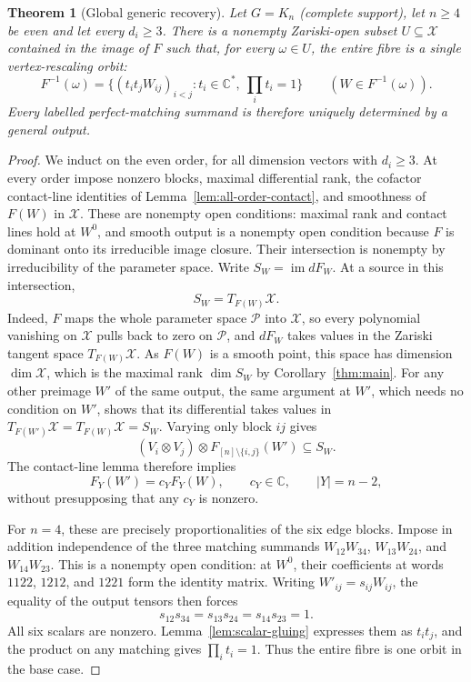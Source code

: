 \documentclass[11pt]{article}
\newtheorem{theorem}{Theorem}[section]
\theoremstyle{remark}\newtheorem{remark}[theorem]{Remark}
\newcommand{\C}{\mathbb C}
\newcommand{\cP}{\mathcal P}
\newcommand{\cX}{\mathcal X}
\begin{document}
\begin{theorem}[Global generic recovery]\label{thm:global-all-order}
Let $G=K_n$ (complete support), let $n\geq4$ be even and let every
$d_i\geq3$. There is a nonempty
Zariski-open subset $U\subseteq\cX$ contained in the image of $F$
such that, for every $\omega\in U$, the entire fibre is a single
vertex-rescaling orbit:
\[
 F^{-1}(\omega)=\{(t_it_jW_{ij})_{i<j}:t_i\in\C^*,\ \prod_i t_i=1\}
 \qquad(W\in F^{-1}(\omega)).
\]
Every labelled perfect-matching summand is therefore uniquely
determined by a general output.
\end{theorem}
\begin{proof}
We induct on the even order, for all dimension vectors with $d_i\geq3$.
At every order impose nonzero blocks, maximal differential rank,
the cofactor contact-line identities of
Lemma~\ref{lem:all-order-contact}, and smoothness of $F(W)$ in
$\cX$. These are nonempty open conditions: maximal rank and contact
lines hold at $W^0$, and smooth output is a nonempty open condition
because $F$ is dominant onto its irreducible image closure.
Their intersection is nonempty by irreducibility of the parameter
space. Write $S_W=\operatorname{im}dF_W$. At a source in this
intersection,
\[
 S_W=T_{F(W)}\cX.
\]
Indeed, $F$ maps the whole parameter space $\cP$ into $\cX$, so every
polynomial vanishing on $\cX$ pulls back to zero on $\cP$, and $dF_W$
takes values in the Zariski tangent space $T_{F(W)}\cX$. As $F(W)$ is
a smooth point, this space has dimension $\dim\cX$, which is the
maximal rank $\dim S_W$ by Corollary~\ref{thm:main}.
For any other preimage $W'$ of the same output, the same argument at
$W'$, which needs no condition on $W'$, shows that its differential
takes values in $T_{F(W')}\cX=T_{F(W)}\cX=S_W$. Varying only block
$ij$ gives
\[
 (V_i\otimes V_j)\otimes F_{[n]\setminus\{i,j\}}(W')
 \subseteq S_W.
\]
The contact-line lemma therefore implies
\begin{equation}\label{eq:all-order-proportional-cofactors}
 F_Y(W')=c_YF_Y(W),\qquad c_Y\in\C,
 \qquad |Y|=n-2,
\end{equation}
without presupposing that any $c_Y$ is nonzero.

For $n=4$, these are precisely proportionalities of the six edge
blocks. Impose in addition independence of the three matching
summands $W_{12}W_{34}$, $W_{13}W_{24}$, and $W_{14}W_{23}$.
This is a nonempty open condition: at $W^0$, their coefficients at
words $1122$, $1212$, and $1221$ form the identity matrix.
Writing $W'_{ij}=s_{ij}W_{ij}$, the equality of the output tensors
then forces
\[
 s_{12}s_{34}=s_{13}s_{24}=s_{14}s_{23}=1.
\]
All six scalars are nonzero. Lemma~\ref{lem:scalar-gluing} expresses
them as $t_it_j$, and the product on any matching gives
$\prod_i t_i=1$. Thus the entire fibre is one orbit in the base case.


\end{proof}
\end{document}
